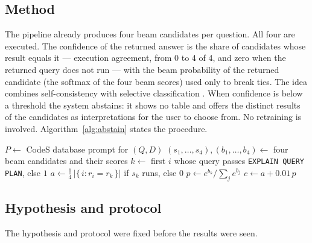 \subsection{Method}

The pipeline already produces four beam candidates per question. All four are executed. The confidence of the returned answer is the share of candidates whose result equals it --- execution agreement, from 0 to 4 of 4, and zero when the returned query does not run --- with the beam probability of the returned candidate (the softmax of the four beam scores) used only to break ties. The idea combines self-consistency \cite{wang2022selfconsistency} with selective classification \cite{geifman2017selective}. When confidence is below a threshold the system abstains: it shows no table and offers the distinct results of the candidates as interpretations for the user to choose from. No retraining is involved. Algorithm~\ref{alg:abstain} states the procedure.

\begin{algorithm}[!t]
	\SetAlgoLined
	$P \leftarrow$ CodeS database prompt for $(Q, D)$\;
	$(s_1, \dots, s_4), (b_1, \dots, b_4) \leftarrow$ four beam candidates and their scores\;
	$k \leftarrow$ first $i$ whose query passes \texttt{EXPLAIN QUERY PLAN}, else $1$\;
	$a \leftarrow \frac{1}{4}\,\lvert\{\, i : r_i = r_k \,\}\rvert$ if $s_k$ runs, else $0$\;
	$p \leftarrow e^{b_k} / \sum_j e^{b_j}$\;
	$c \leftarrow a + 0.01\,p$\;
	\caption{Confidence-aware abstention on top of CodeS}
	\label{alg:abstain}
\end{algorithm}

\subsection{Hypothesis and protocol}

The hypothesis and protocol were fixed before the results were seen.

